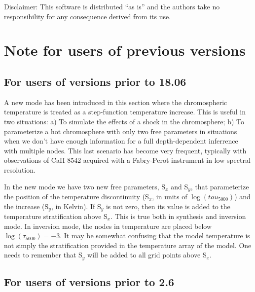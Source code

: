Disclaimer: This software is distributed ``as is'' and the authors
take no responsibility for any consequence derived from its use.


\chapter{Note for users of previous versions}

\section{For users of versions prior to 18.06}
\label{explainSx}
A new mode has been introduced in this section where the chromospheric
temperature is treated as a step-function temperature increase. This
is useful in two situations: a) To simulate the effects of a shock in
the chromosphere; b) To parameterize a hot chromosphere with only two
free parameters in situations when we don't have enough information
for a full depth-dependent inferrence with multiple nodes. This last
scenario has become very frequent, typically with observations of
CaII 8542 acquired with a Fabry-Perot instrument in low
spectral resolution.

In the new mode we have two new free parameters, S$_x$ and S$_y$, that
parameterize the position of the temperature discontinuity (S$_x$, in
units of $\log(tau_{5000})$) and the increase (S$_y$, in Kelvin). If
S$_y$ is not zero, then its value is added to the temperature
stratification above S$_x$. This is true both in synthesis and
inversion mode. In inversion mode, the nodes in temperature are placed
below $\log(\tau_{5000})=-3$. It may be somewhat confusing that the
model temperature is not simply the stratification provided in the
temperature array of the model. One needs to remember that S$_y$ will
be added to all grid points above S$_x$.


\section{For users of versions prior to 2.6}

